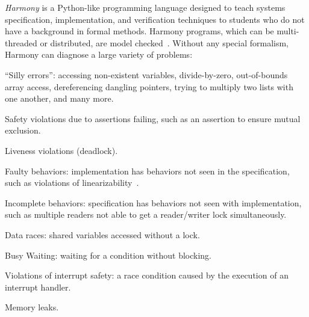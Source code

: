 \documentclass[twocolumn]{article}
\begin{document}
\emph{Harmony} is a Python-like programming language designed to teach
systems specification, implementation, and verification techniques to
students who do not have a background in formal methods.
Harmony programs, which can be multi-threaded
or distributed, are model checked~\cite{CES86}.
Without any special formalism, Harmony can diagnose a large variety
of problems:
\begin{compactitem}
\item ``Silly errors'': accessing non-existent variables,
divide-by-zero, out-of-bounds array access, dereferencing dangling
pointers, trying to multiply two lists with one another,
and many more.
\item Safety violations due to assertions failing, such as an assertion to ensure mutual exclusion.
\item Liveness violations (deadlock).
\item Faulty behaviors: implementation has behaviors not seen in the specification, such as violations of linearizability~\cite{HW90}.
\item Incomplete behaviors: specification has behaviors not seen with implementation, such as multiple readers not able to get a reader/writer lock simultaneously.
\item Data races: shared variables accessed without a lock.
\item Busy Waiting: waiting for a condition without blocking.
\item Violations of interrupt safety: a race condition caused by the execution
of an interrupt handler.
\item Memory leaks.
\end{compactitem}
\end{document}
